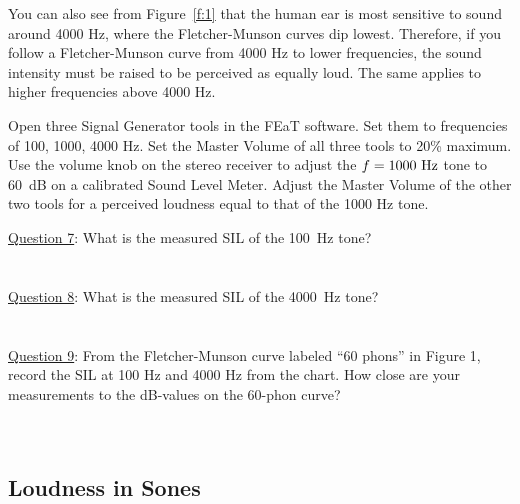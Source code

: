 \documentclass[11pt]{NSF}
\begin{document}
You can also see from Figure~\ref{f:1} that the human ear is most sensitive to
sound around 4000 Hz, where the Fletcher-Munson curves dip lowest.
Therefore, if you follow a Fletcher-Munson curve from 4000 Hz to lower
frequencies, the sound intensity must be raised to be perceived as
equally loud. The same applies to higher frequencies above 4000 Hz.

Open three Signal Generator tools in the FEaT software. Set them to frequencies of 100, 1000,
4000 Hz. Set the Master Volume of all three tools to 20\% maximum. Use the volume knob on
the stereo receiver to adjust the $f =1000~{\rm Hz}$ tone to 60~dB on a calibrated Sound Level Meter.
Adjust the Master Volume of the other two tools for a perceived loudness equal to that of the
1000 Hz tone. 

\underline{Question 7}: What is the measured SIL of the 100~Hz tone?
\\
\\
\\

\underline{Question 8}: What is the measured SIL of the 4000~Hz tone?
\\
\\
\\
\underline{Question 9}: From the Fletcher-Munson curve labeled “60 phons” in Figure 1, record the SIL at 100 Hz and
4000 Hz from the chart. How close are your measurements to the dB-values on the 60-phon curve? 
\\
\\
\\
\subsection{Loudness in Sones}
\end{document}
